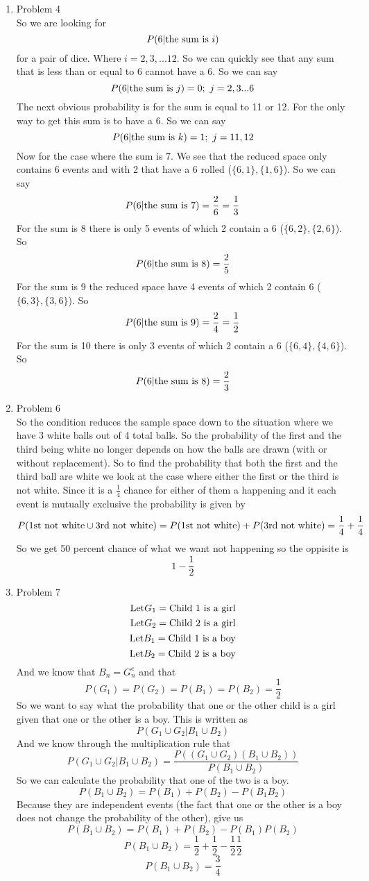 \documentclass[11pt]{article}
\begin{document}
\begin{enumerate}
\item Problem 4\\
So we are looking for
$$P(6|\textnormal{the sum is}\ i)$$
for a pair of dice. Where $i = 2,3,...12$. So we can quickly see that any sum that is less than or equal to 6 cannot have a 6. So we can say
$$P(6|\textnormal{the sum is}\ j) =0;\ j=2,3...6$$
The next obvious probability is for the sum is equal to 11 or 12. For the only way to get this sum is to have a 6. So we can say
$$P(6|\textnormal{the sum is}\ k) =1;\ j=11,12$$
Now for the case where the sum is 7. We see that the reduced space only contains 6 events and with 2 that have a 6 rolled ($\{6,1\},\{1,6\}$). So we can say
$$P(6|\textnormal{the sum is}\ 7) = \frac{2}{6} = \frac{1}{3}$$
For the sum is 8 there is only 5 events of which 2 contain a 6 ($\{6,2\},\{2,6\}$). So
$$P(6|\textnormal{the sum is}\ 8) = \frac{2}{5}$$
For the sum is 9 the reduced space have 4 events of which 2 contain 6 ($\{6,3\},\{3,6\}$). So
$$P(6|\textnormal{the sum is}\ 9) = \frac{2}{4}=\frac{1}{2}$$
For the sum is 10 there is only 3 events of which 2 contain a 6 ($\{6,4\},\{4,6\}$). So
$$P(6|\textnormal{the sum is}\ 8) = \frac{2}{3}$$
\item Problem 6\\
So the condition reduces the sample space down to the situation where we have 3 white balls out of 4 total balls. So the probability of the first and the third being white no longer depends on how the balls are drawn (with or without replacement). So to find the probability that both the first and the third ball are white we look at the case where either the first or the third is not white. Since it is a $\frac{1}{4}$ chance for either of them a happening and it each event is mutually exclusive the probability is given by
$$P(\textnormal{1st not white}\cup\textnormal{3rd not white}) = P(\textnormal{1st not white})+P(\textnormal{3rd not white}) = \frac{1}{4}+\frac{1}{4}$$
So we get 50 percent chance of what we want not happening so the oppisite is
$$1 -\frac{1}{2}$$
\begin{center}
\end{center}
\item Problem 7\\
$$\textnormal{Let} G_1 = \textnormal{Child 1 is a girl}$$
$$\textnormal{Let} G_2 = \textnormal{Child 2 is a girl}$$
$$\textnormal{Let} B_1 = \textnormal{Child 1 is a boy}$$
$$\textnormal{Let} B_2 = \textnormal{Child 2 is a boy}$$
And we know that $B_n = G_n^c$ and that 
$$P(G_1)=P(G_2)=P(B_1)=P(B_2)=\frac{1}{2}$$
So we want to say what the probability that one or the other child is a girl given that one or the other is a boy. This is written as
$$P(G_1\cup G_2|B_1\cup B_2)$$
And we know through the multiplication rule that
$$P(G_1\cup G_2|B_1\cup B_2) = \frac{P((G_1\cup G_2)(B_1\cup B_2))}{P(B_1\cup B_2)}$$
So we can calculate the probability that one of the two is a boy.
$$P(B_1\cup B_2) = P(B_1) + P(B_2) - P(B_1B_2)$$
Because they are independent events (the fact that one or the other is a boy does not change the probability of the other), give us
$$P(B_1\cup B_2) = P(B_1) + P(B_2) - P(B_1)P(B_2)$$
$$P(B_1\cup B_2) = \frac{1}{2}+\frac{1}{2}-\frac{1}{2}\frac{1}{2}$$
$$P(B_1\cup B_2) = \frac{3}{4}$$


\end{enumerate}
\end{document}
